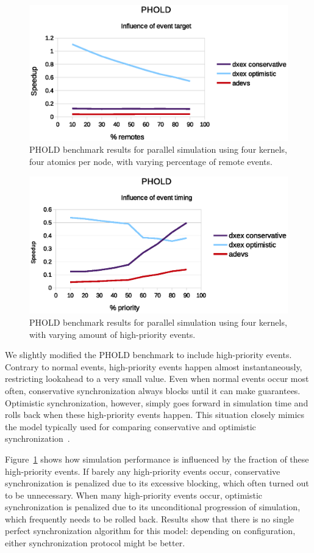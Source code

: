\begin{figure}
    \center
    \includegraphics[width=\columnwidth]{fig/phold_remotes.eps}
    \caption{PHOLD benchmark results for parallel simulation using four kernels, four atomics per node, with varying percentage of remote events.}
\end{figure}
\begin{figure}
	\center
	\includegraphics[width=\columnwidth]{fig/phold_priority.eps}
	\caption{PHOLD benchmark results for parallel simulation using four kernels, with varying amount of high-priority events.}
	\label{fig:phold_priority}
\end{figure}

We slightly modified the PHOLD benchmark to include high-priority events.
Contrary to normal events, high-priority events happen almost instantaneously, restricting lookahead to a very small value.
Even when normal events occur most often, conservative synchronization always blocks until it can make guarantees.
Optimistic synchronization, however, simply goes forward in simulation time and rolls back when these high-priority events happen.
This situation closely mimics the model typically used for comparing conservative and optimistic synchronization~\cite{FujimotoBook}.

Figure~\ref{fig:phold_priority} shows how simulation performance is influenced by the fraction of these high-priority events.
If barely any high-priority events occur, conservative synchronization is penalized due to its excessive blocking, which often turned out to be unnecessary.
When many high-priority events occur, optimistic synchronization is penalized due to its unconditional progression of simulation, which frequently needs to be rolled back.
Results show that there is no single perfect synchronization algorithm for this model: depending on configuration, either synchronization protocol might be better.
